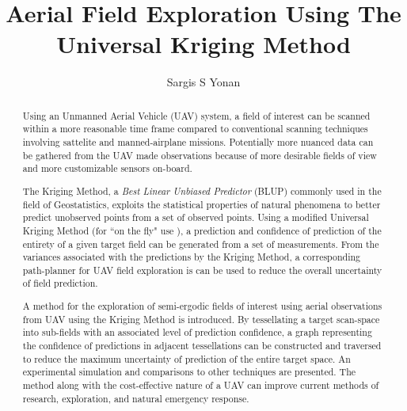 \documentclass[11pt]{ucthesis}
\begin{document}

\title{Aerial Field Exploration Using The Universal Kriging Method}
\author{Sargis S Yonan}
\deanlinethree{}

\begin{frontmatter}

\maketitle
\copyrightpage

\tableofcontents
\listoffigures
\listoftables

\begin{abstract}
Using an Unmanned Aerial Vehicle (UAV) system, a field of interest can be scanned within a more reasonable time frame compared to conventional scanning techniques involving sattelite and manned-airplane missions. Potentially more nuanced data can be gathered from the UAV made observations because of more desirable fields of view and more customizable sensors on-board.

The Kriging Method, a \textit{Best Linear Unbiased Predictor} (BLUP) commonly used in the field of Geostatistics, exploits the statistical properties of natural phenomena to better predict unobserved points from a set of observed points. Using a modified Universal Kriging Method (for ``on the fly" use ), a prediction and confidence of prediction of the entirety of a given target field can be generated from a set of measurements. From the variances associated with the predictions by the Kriging Method, a corresponding path-planner for UAV field exploration is can be used to reduce the overall uncertainty of field prediction.

A method for the exploration of semi-ergodic fields of interest using aerial observations from UAV using the Kriging Method is introduced. By tessellating a target scan-space into sub-fields with an associated level of prediction confidence, a graph representing the confidence of predictions in adjacent tessellations can be constructed and traversed to reduce the maximum uncertainty of prediction of the entire target space. An experimental simulation and comparisons to other techniques are presented. The method along with the cost-effective nature of a UAV can improve current methods of research, exploration, and natural emergency response. 
\end{abstract}


\end{frontmatter}
\end{document}
